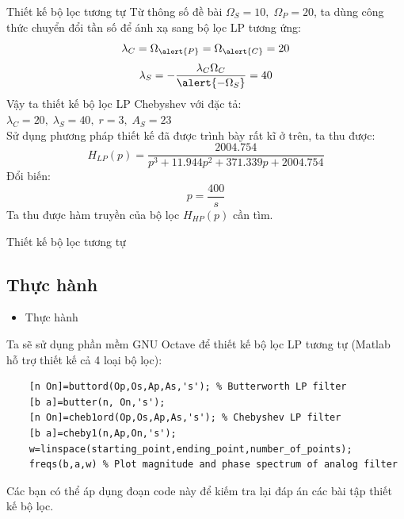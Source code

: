 \documentclass[8pt]{beamer}
\begin{document}
\begin{frame}{Thiết kế bộ lọc tương tự}
Từ thông số đề bài $\Omega_{S}=10,\;\Omega_{P}=20$, ta dùng công thức chuyển đổi tần số để ánh xạ sang bộ lọc LP tương ứng:
$$\lambda_{C}=\Omega_{\alert{P}}=\Omega_{\alert{C}}=20$$
$$\lambda_{S}=-\frac{\lambda_{C}\Omega_{C}}{\alert{-\Omega_{S}}}=40$$
Vậy ta thiết kế bộ lọc LP Chebyshev với đặc tả: $\lambda_{C}=20,\;\lambda_{S}=40,\;r=3,\;A_{S}=23$
\\ Sử dụng phương pháp thiết kế đã được trình bày rất kĩ ở trên, ta thu được:
$$H_{LP}(p)=\frac{2004.754}{p^3+11.944p^2+371.339p+2004.754}$$
Đổi biến: $$p=\frac{400}{s}$$
Ta thu được hàm truyền của bộ lọc $H_{HP}(p)$ cần tìm.
\end{frame}
\begin{frame}[fragile]{Thiết kế bộ lọc tương tự}
\subsection{Thực hành}
\begin{itemize}
	\item Thực hành
\end{itemize}
Ta sẽ sử dụng phần mềm GNU Octave để thiết kế bộ lọc LP tương tự (Matlab hỗ trợ thiết kế cả 4 loại bộ lọc):
\begin{verbatim}
	[n On]=buttord(Op,Os,Ap,As,'s'); % Butterworth LP filter
	[b a]=butter(n, On,'s');
	[n On]=cheb1ord(Op,Os,Ap,As,'s'); % Chebyshev LP filter
	[b a]=cheby1(n,Ap,On,'s'); 
	w=linspace(starting_point,ending_point,number_of_points);
	freqs(b,a,w) % Plot magnitude and phase spectrum of analog filter
\end{verbatim}
Các bạn có thể áp dụng đoạn code này để kiếm tra lại đáp án các bài tập thiết kế bộ lọc.
\end{frame}
\end{document}
